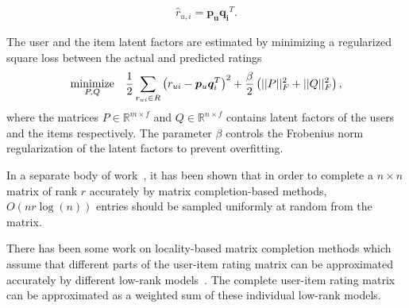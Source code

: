 \begin{equation} \label{mf_eq}
  \begin{split}
    \hat{r}_{u,i} = \bm{p_u}\bm{q_i}^T.
  \end{split}
\end{equation}


The user and the item latent factors are estimated by minimizing a regularized
square loss between the actual and predicted ratings 
\begin{equation} \label{mf_obj}
  \begin{aligned}
    \minimize_{P, Q} & &\frac{1}{2}\sum_{r_{ui} \in R}
    \left(r_{ui} - \bm{p}_u\bm{q}_i^T \right)^2+ \frac{\beta}{2}
    \left(||P||_F^2 + ||Q||_F^2 \right),
  \end{aligned}
\end{equation}
where the matrices $P \in \mathbb{R}^{m \times f}$ and $Q \in\mathbb{R}^{n \times f}$ 
contains latent factors of the users and the items
respectively. The parameter $\beta$ controls the Frobenius norm regularization
of the latent factors to prevent overfitting.

In a separate body of work~\cite{CandesTao2010, CandesRecht09}, it has been shown that in order to complete a $n \times n$ matrix of rank $r$
accurately by matrix completion-based methods, $O(nr \log(n))$ entries should be sampled uniformly at random from the
matrix.

\iffalse
In real-world recommendation systems, it is not possible for a user to indicate
his or her preferences over all the available items thereby leading to missing
ratings in the user-item rating matrix. There has been some work that assumes
all ratings are \emph{missing not at random} (MNAR) and models the missing data to improve the
generated recommendations~\cite{marlin2012collaborative, pan2008one,
hernandez2014probabilistic, Steck2010MNAR, Steck2013EvalRec, lim2015top,
KimRecsys2014}.

However, in our work, we focus on investigating how
do the missing ratings, i.e., both \emph{missing at random} (MAR) and \emph{missing not at
random} (MNAR), or specifically how does the presence of few ratings for the
users and the items affect the matrix completion-based methods. We use our analysis
to develop a matrix completion-based approach to improve recommendations for the
users who have provided few ratings on items or for the items that have
received few ratings from the users.
\fi

There has been some work on locality-based matrix completion  methods which
assume that different parts of the user-item rating matrix can be approximated
accurately by different low-rank models~\cite{lee2013local,
lee2014local,chen2015wemarec}. The complete user-item rating matrix
can be approximated as a weighted sum of these individual low-rank models. 


